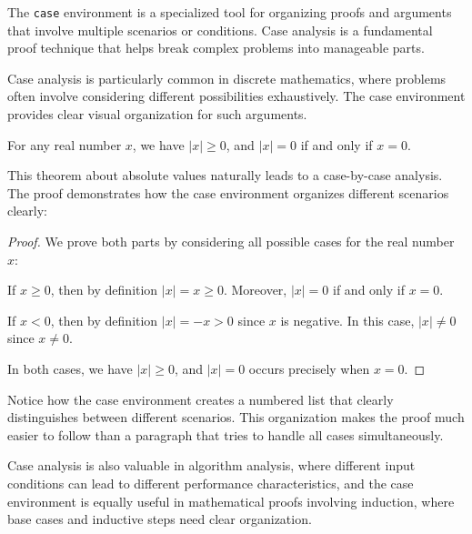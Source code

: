 \documentclass[9pt]{amsart}
\begin{document}
The \texttt{case} environment is a specialized tool for organizing proofs and
arguments that involve multiple scenarios or conditions. Case analysis is a
fundamental proof technique that helps break complex problems into manageable
parts.

Case analysis is particularly common in discrete mathematics, where problems
often involve considering different possibilities exhaustively. The case
environment provides clear visual organization for such arguments.

\begin{theorem}
	For any real number $x$, we have $|x| \geq 0$, and $|x| = 0$ if and only if $x = 0$.
\end{theorem}

This theorem about absolute values naturally leads to a case-by-case analysis.
The proof demonstrates how the case environment organizes different scenarios
clearly:

\begin{proof}
	We prove both parts by considering all possible cases for the real number $x$:
	\begin{case}
		\item If $x \geq 0$, then by definition $|x| = x \geq 0$. Moreover, $|x| = 0$ if and
		only if $x = 0$.
		\item If $x < 0$, then by definition $|x| = -x > 0$ since $x$ is negative. In this
		case, $|x| \neq 0$ since $x \neq 0$.
	\end{case}
	In both cases, we have $|x| \geq 0$, and $|x| = 0$ occurs precisely when $x = 0$.
\end{proof}

Notice how the case environment creates a numbered list that clearly
distinguishes between different scenarios. This organization makes the proof
much easier to follow than a paragraph that tries to handle all cases
simultaneously.

Case analysis is also valuable in algorithm analysis, where different input
conditions can lead to different performance characteristics, and the case
environment is equally useful in mathematical proofs involving induction, where
base cases and inductive steps need clear organization.
\end{document}
